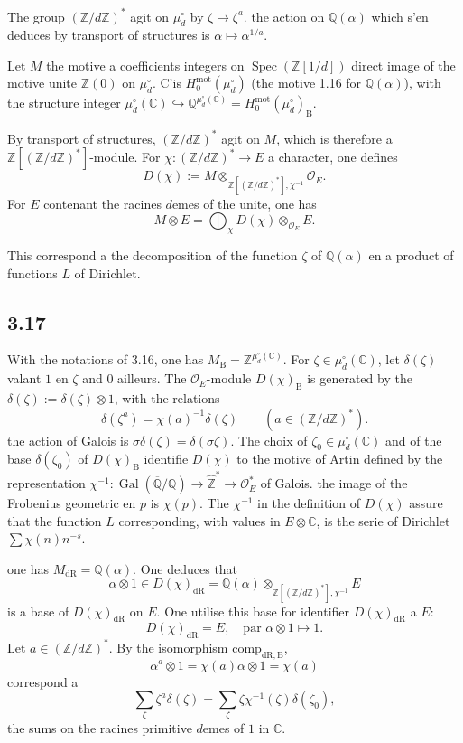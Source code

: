 \documentclass[12pt,a4paper]{article}
\theoremstyle{plain}
\theoremstyle{definition}
\theoremstyle{remark}
\DeclareMathOperator{\Spec}{Spec}
\DeclareMathOperator{\Gal}{Gal}
\newcommand{\DR}{\mathrm{dR}}
\newcommand{\B}{\mathrm{B}}
\newcommand{\mot}{\mathrm{mot}}
\newcommand{\OO}{\mathcal{O}}
\newcommand{\Z}{\mathbb{Z}}
\newcommand{\Q}{\mathbb{Q}}
\newcommand{\C}{\mathbb{C}}
\begin{document}
The group $(\Z/d\Z)^*$ agit on $\mu_d^\circ$ by $\zeta \mapsto \zeta^a$. the action on $\Q(\alpha)$ which s'en deduces by transport of structures is $\alpha \mapsto \alpha^{1/a}$.

Let $M$ the motive a coefficients integers on $\Spec(\Z[1/d])$ direct image of the motive unite $\Z(0)$ on $\mu_d^\circ$. C'is $H^{\mot}_0(\mu_d^\circ)$ (the motive 1.16 for $\Q(\alpha)$), with the structure integer $\mu_d^\circ(\C) \hookrightarrow \Q^{\mu_d^\circ(\C)} = H^{\mot}_0(\mu_d^\circ)_{\B}$.

By transport of structures, $(\Z/d\Z)^*$ agit on $M$, which is therefore a $\Z[(\Z/d\Z)^*]$-module. For $\chi: (\Z/d\Z)^* \to E$ a character, one defines
\[
D(\chi) := M \mathop{\otimes}_{\Z[(\Z/d\Z)^*],\chi^{-1}} \OO_E.
\]
For $E$ contenant the racines $d$emes of the unite, one has
\[
M \otimes E = \bigoplus_\chi D(\chi) \otimes_{\OO_E} E.
\]

This correspond a the decomposition of the function $\zeta$ of $\Q(\alpha)$ en a product of functions $L$ of Dirichlet.

\subsection*{3.17}

With the notations of 3.16, one has $M_{\B} = \Z^{\mu_d^\circ(\C)}$. For $\zeta \in \mu_d^\circ(\C)$, let $\delta(\zeta)$ valant $1$ en $\zeta$ and $0$ ailleurs. The $\OO_E$-module $D(\chi)_{\B}$ is generated by the $\delta(\zeta) := \delta(\zeta) \otimes 1$, with the relations
\begin{equation*}\tag{3.17.1}
\delta(\zeta^a) = \chi(a)^{-1}\delta(\zeta) \qquad (a \in (\Z/d\Z)^*).
\end{equation*}
the action of Galois is $\sigma\delta(\zeta) = \delta(\sigma\zeta)$. The choix of $\zeta_0 \in \mu_d^\circ(\C)$ and of the base $\delta(\zeta_0)$ of $D(\chi)_{\B}$ identifie $D(\chi)$ to the motive of Artin defined by the representation $\chi^{-1}: \Gal(\overline{\Q}/\Q) \to \hat{\Z}^* \to \OO_E^*$ of Galois. the image of the Frobenius geometric en $p$ is $\chi(p)$. The $\chi^{-1}$ in the definition of $D(\chi)$ assure that the function $L$ corresponding, with values in $E \otimes \C$, is the serie of Dirichlet $\sum \chi(n)n^{-s}$.

one has $M_{\DR} = \Q(\alpha)$. One deduces that
\[
\alpha \otimes 1 \in D(\chi)_{\DR} = \Q(\alpha) \mathop{\otimes}_{\Z[(\Z/d\Z)^*],\chi^{-1}} E
\]
is a base of $D(\chi)_{\DR}$ on $E$. One utilise this base for identifier $D(\chi)_{\DR}$ a $E$:
\begin{equation*}\tag{3.17.2}
D(\chi)_{\DR} = E, \quad \text{par } \alpha \otimes 1 \mapsto 1.
\end{equation*}
Let $a \in (\Z/d\Z)^*$. By the isomorphism $\mathrm{comp}_{\DR,\B}$,
\[
\alpha^a \otimes 1 = \chi(a)\alpha \otimes 1 = \chi(a)
\]
correspond a
\begin{equation*}\tag{3.17.3}
\sum_\zeta \zeta^a \delta(\zeta) = \sum_\zeta \zeta \chi^{-1}(\zeta)\delta(\zeta_0),
\end{equation*}
the sums on the racines primitive $d$emes of $1$ in $\C$.
\end{document}
